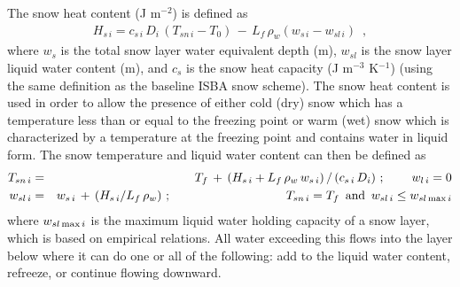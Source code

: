 The snow heat content (J m$^{-2}$) is defined as
%
\begin{eqnarray}
H_{s\,i} = c_{s\,i}\,D_i\,\left(T_{sn\,i}-T_0\right)
\,-\, L_f\,\rho_w \left(w_{s\,i}- w_{sl\,i}\right)\,\,\,,
\end{eqnarray}
%
where $w_s$ is the total snow layer water equivalent depth (m),
$w_{sl}$ is the snow layer liquid water content (m), and $c_s$
is the snow heat capacity (J m$^{-3}$ K$^{-1}$) (using the same
definition as the baseline ISBA snow scheme).
The snow heat content is used in order to allow
the presence of either
cold (dry) snow which has a temperature less
than or equal to the freezing point
or warm (wet)
snow which is characterized by a temperature at the freezing point
and contains water in liquid form.
The snow temperature
and liquid water content can then be defined as
%
\begin{eqnarray}
T_{sn\,i} &=& T_f \,+\, \left(H_{s\,i}  + L_f\,\rho_w\,w_{s\,i}\right)
/\left(c_{s\,i}\,D_i \right) \,;
\hskip.3in
w_{l\,i} = 0 \\
%
w_{sl\,i} &=& w_{s\,i} \,+\, \left(H_{s\,i}/L_f\,\rho_w\right) \,;
\hskip1.3in
T_{sn\,i} = T_f \,\,\,{\rm and} \,\,\, w_{sl\,i} \leq w_{sl\,{\rm max}\,i}
\end{eqnarray}
%
where $w_{sl\,{\rm max}\,i}$ is the maximum liquid water
holding capacity of a snow layer,
which is based on empirical relations. All
water exceeding this flows into the layer below where
it can do one or all of the following:
add to the liquid water content, refreeze, or continue
flowing downward. 

